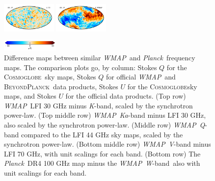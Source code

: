 \documentclass[twocolumn]{../../common/aa}
\def\WMAP{\emph{WMAP}}
\def\Planck{\emph{Planck}}
\newcommand{\BP}{\textsc{BeyondPlanck}}
\newcommand{\cosmoglobe}{\textsc{Cosmoglobe}}
\newcommand{\K}[0]{\textit K}
\newcommand{\Ka}[0]{\textit{Ka}}
\newcommand{\Q}[0]{\textit Q}
\newcommand{\V}[0]{\textit V}
\newcommand{\W}[0]{\textit W}
\begin{document}
\begin{figure}
	\includegraphics[width=0.24\textwidth]{figures/100W_deltaU.pdf}
	\includegraphics[width=0.24\textwidth]{figures/100W_W_deltaU.pdf}
	
        \includegraphics[width=0.25\textwidth]{figures/cbar_10uK.pdf}
	\caption{Difference maps between similar \WMAP\ and \Planck\ frequency maps. The comparison plots go, by column: Stokes $Q$ for the \cosmoglobe\ sky maps, Stokes $Q$ for official \WMAP\ and \BP\ data products, Stokes $U$ for the \cosmoglobe sky maps, and Stokes $U$ for the official data products. (Top row) \WMAP\ LFI 30 GHz minus \K-band, scaled by the synchrotron power-law. (Top middle row) \WMAP\ \Ka-band minus LFI 30 GHz, also scaled by the synchrotron power-law. (Middle row) \WMAP\ \Q-band compared to the LFI 44 GHz sky maps, scaled by the synchrotron power-law. (Bottom middle row) \WMAP\ \V-band minus LFI 70 GHz, with unit scalings for each band. (Bottom row) The \Planck\ DR4 100 GHz map minus the \WMAP\ \W-band\, also with unit scalings for each band.}
	\label{fig:wmap_lfi_compare}
\end{figure}
\end{document}
